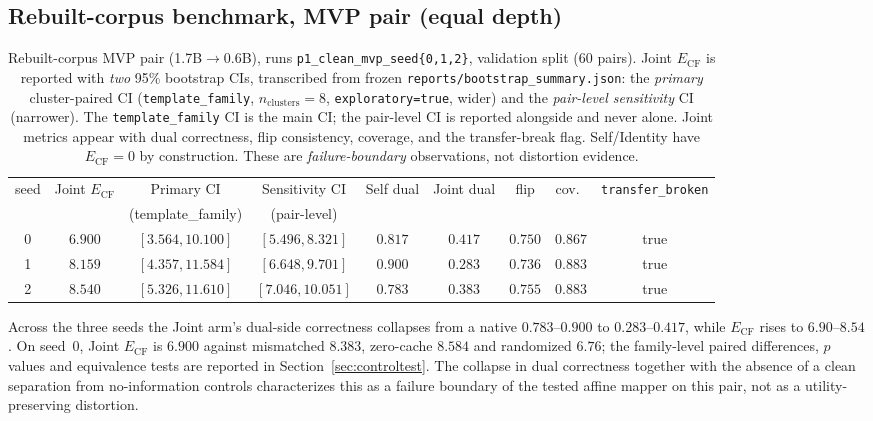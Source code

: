 \documentclass[11pt,twocolumn]{article}
\begin{document}
\subsection{Rebuilt-corpus benchmark, MVP pair (equal depth)}
\label{sec:mvp}

\begin{table}[t]
\centering
\caption{Rebuilt-corpus MVP pair (1.7B$\to$0.6B), runs
\texttt{p1\_clean\_mvp\_seed\{0,1,2\}}, validation
split (60 pairs). Joint $E_{\mathrm{CF}}$ is reported with \emph{two} 95\%
bootstrap CIs, transcribed from frozen \texttt{reports/bootstrap\_summary.json}:
the \emph{primary} cluster-paired CI (\texttt{template\_family},
$n_{\mathrm{clusters}}=8$, \texttt{exploratory=true}, wider) and the
\emph{pair-level sensitivity} CI (narrower). The
\texttt{template\_family} CI is the main CI; the pair-level CI is reported
alongside and never alone. Joint metrics appear with dual correctness, flip
consistency, coverage, and the transfer-break flag. Self/Identity have
$E_{\mathrm{CF}}=0$ by construction. These are \emph{failure-boundary}
observations, not distortion evidence.}
\label{tab:cleanmvp}
\small
\begin{tabular}{ccccccccc}
\toprule
seed & Joint $E_{\mathrm{CF}}$ & Primary CI & Sensitivity CI & Self dual & Joint dual & flip & cov.\ & \texttt{transfer\_broken} \\
 & & (template\_family) & (pair-level) & & & & & \\
\midrule
0 & $6.900$ & $[3.564,10.100]$ & $[5.496,8.321]$ & $0.817$ & $0.417$ & $0.750$ & $0.867$ & true \\
1 & $8.159$ & $[4.357,11.584]$ & $[6.648,9.701]$ & $0.900$ & $0.283$ & $0.736$ & $0.883$ & true \\
2 & $8.540$ & $[5.326,11.610]$ & $[7.046,10.051]$ & $0.783$ & $0.383$ & $0.755$ & $0.883$ & true \\
\bottomrule
\end{tabular}
\end{table}

Across the three seeds the Joint arm's dual-side correctness collapses from a
native $0.783$--$0.900$ to $0.283$--$0.417$, while $E_{\mathrm{CF}}$ rises to
$6.90$--$8.54$. On seed~0, Joint $E_{\mathrm{CF}}$ is $6.900$ against
mismatched $8.383$, zero-cache $8.584$ and randomized $6.76$; the family-level
paired differences, $p$ values and equivalence tests are reported in
Section~\ref{sec:controltest}. The collapse in dual correctness together with
the absence of a clean separation from no-information controls characterizes
this as a failure boundary of the tested affine mapper on this pair, not as a
utility-preserving distortion.
\end{document}
